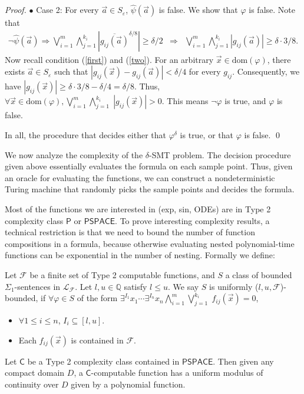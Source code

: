 \documentclass[prodmode]{acmsmall} %
\newcommand{\dom}{\mathrm{dom}}
\begin{document}
\begin{proof}
$\bullet$ Case 2: For every $\vec a\in S_{\varepsilon}$, $\widehat{\psi}(\vec a)$ is false. We show that $\varphi$ is false. Note that
\begin{eqnarray*}
\neg\widehat{\psi}(\vec a) \Rightarrow \bigvee_{i=1}^m \bigwedge_{j=1}^{k_i} |\overline{g_{ij}(\vec a)}^{\delta/8}|\geq\delta/2 
&\Rightarrow&\bigvee_{i=1}^m \bigwedge_{j=1}^{k_i} |g_{ij}(\vec a)|\geq \delta\cdot 3/8. 
\end{eqnarray*}
Now recall condition (\ref{first}) and (\ref{two}). For an arbitrary $\vec x\in \dom(\varphi)$, there exists $\vec a\in S_{\varepsilon}$ such that $|g_{ij}(\vec x)-g_{ij}(\vec a)|<\delta/4$ for every $g_{ij}$. Consequently, we have $|g_{ij}(\vec x)|\geq \delta\cdot 3/8- \delta/4 = \delta/8.$ Thus, $\forall \vec x\in \dom(\varphi), \bigvee_{i=1}^m\bigwedge_{j=1}^{k_i}\; |g_{ij}(\vec x)|>0.$ This means $\neg \varphi$ is true, and $\varphi$ is false. 

In all, the procedure that decides either that $\varphi^{\delta}$ is true, or that $\varphi$ is false. 
\qed\end{proof}

We now analyze the complexity of the $\delta$-SMT problem. The decision procedure given above essentially evaluates the formula on each sample point. Thus, given an oracle for evaluating the functions, we can construct a nondeterministic Turing machine that randomly picks the sample points and decides the formula.

Most of the functions we are interested in (exp, sin, ODEs) are in Type 2 complexity class $\mathsf{P}$ or $\mathsf{PSPACE}$. To prove interesting complexity results, a technical restriction is that we need to bound the number of function compositions in a formula, because otherwise evaluating nested polynomial-time functions can be exponential in the number of nesting. Formally we define: 
\begin{definition}
Let $\mathcal{F}$ be a finite set of Type 2 computable functions, and $S$ a class of bounded $\Sigma_1$-sentences in $\mathcal{L}_{\mathcal{F}}$. Let $l,u\in \mathbb{Q}$ satisfy $l\leq u$. We say $S$ is uniformly ($l,u,\mathcal{F}$)-bounded, if $\forall\varphi\in S$ of the form $\exists^{I_1}x_1\cdots\exists^{I_n}x_n \bigwedge_{i=1}^{m}\bigvee_{j=1}^{k_i}\;f_{ij}(\vec x)=0$,
\begin{itemize}
\item $\forall 1\leq i\leq n$, $I_i\subseteq [l,u]$. 
\item Each $f_{ij}(\vec x)$ is contained in $\mathcal{F}$. 
\end{itemize}
\end{definition}
\begin{proposition}\label{polym}
Let $\mathsf{C}$ be a Type 2 complexity class contained in $\mathsf{PSPACE}$. Then given any compact domain $D$, a $\mathsf{C}$-computable function has a uniform modulus of continuity over $D$ given by a polynomial function.
\end{proposition}
\end{document}

